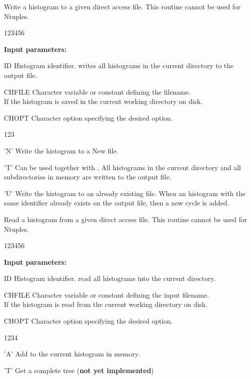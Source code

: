  
\Action
Write a histogram to a given direct  access  file.
This routine cannot be used for Ntuples.
 
\begin{DLtt}{123456}
\item[{\rm\bf Input parameters:}]
\item[ID] Histogram identifier.
           writes all histograms in the current directory to
          the output file.
\item[CHFILE] Character variable or constant defining the filename.\\
          If  the histogram is saved in the
          current working directory on disk.
\item[CHOPT] Character option specifying the desired option.
          \begin{DLtt}{123}
             \item['N'] Write the histogram to a New file.
             \item['T'] Can be used together with . 
                        All histograms in the current directory and all 
                        subdirectories in memory are written to the output file.
            \item['U'] Write the histogram to an already existing \HBOOK{} file.
                       When an histogram with the same identifier already 
                       exists on the output file, then a new cycle is added.
          \end{DLtt}
\end{DLtt}
 
 
\Action
Read a histogram from a given direct  access  file.
This routine cannot be used for Ntuples.
 
\begin{DLtt}{123456}
\item[{\rm\bf Input parameters:}]
\item[ID] Histogram identifier.
           read all histograms into the current directory.
\item[CHFILE]
          Character variable or constant defining the input filename.\\
          If  the histogram is read from the
          current working directory on disk.
\item[CHOPT]
          Character option specifying the desired option.
          \begin{DLtt}{1234}
              \item['A'] Add to the current histogram in memory.
              \item['T'] Get a complete tree (\textbf{not yet implemented})
          \end{DLtt}
\end{DLtt}
 
